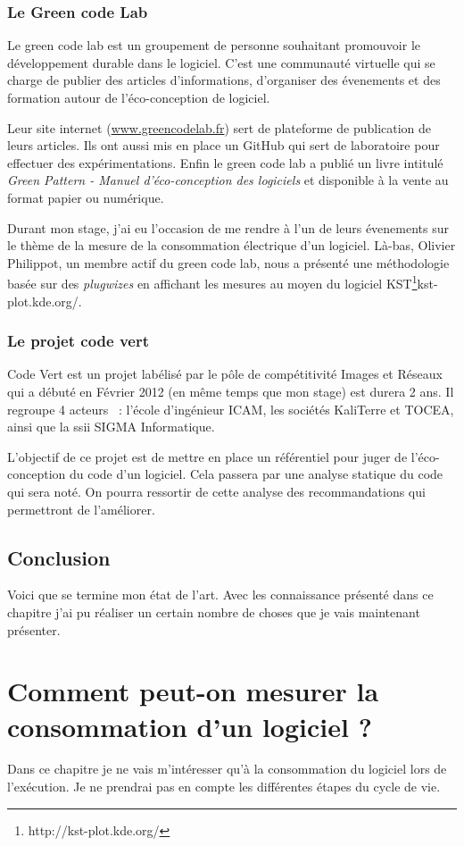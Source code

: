 \documentclass[a4paper, 11pt]{report}
\begin{document}
		\subsection{Le Green code Lab}
Le green code lab est un groupement de personne souhaitant promouvoir le développement durable dans le logiciel. C'est une communauté virtuelle qui se charge de publier des articles d'informations, d'organiser des évenements et des formation autour de l'éco-conception de logiciel.

Leur site internet (\href{http://www.greencodelab.fr}{www.greencodelab.fr}) sert de plateforme de publication de leurs articles. Ils ont aussi mis en place un GitHub qui sert de laboratoire pour effectuer des expérimentations. Enfin le green code lab a publié un livre intitulé \textit{Green Pattern - Manuel d'éco-conception des logiciels} et disponible à la vente au format papier ou numérique.

Durant mon stage, j'ai eu l'occasion de me rendre à l'un de leurs évenements sur le thème de la mesure de la consommation électrique d'un logiciel. Là-bas, Olivier Philippot, un membre actif du green code lab, nous a présenté une méthodologie basée sur des \textit{plugwizes} en affichant les mesures au moyen du logiciel KST\footnote{http://kst-plot.kde.org/}{kst-plot.kde.org/}.
		\subsection{Le projet code vert}
Code Vert est un projet labélisé par le pôle de compétitivité Images et Réseaux qui a débuté en Février 2012 (en même temps que mon stage) est durera 2 ans. Il regroupe 4 acteurs ~: l'école d'ingénieur ICAM, les sociétés KaliTerre et TOCEA, ainsi que la ssii SIGMA Informatique.

L'objectif de ce projet est de mettre en place un référentiel pour juger de l'éco-conception du code d'un logiciel. Cela passera par une analyse statique du code qui sera noté. On pourra ressortir de cette analyse des recommandations qui permettront de l'améliorer.
		
	\section{Conclusion}
Voici que se termine mon état de l'art. Avec les connaissance présenté dans ce chapitre j'ai pu réaliser un certain nombre de choses que je vais maintenant présenter.

\chapter{Comment peut-on mesurer la consommation d'un logiciel ?}
Dans ce chapitre je ne vais m'intéresser qu'à la consommation du logiciel lors de l'exécution. Je ne prendrai pas en compte les différentes étapes du cycle de vie.
\end{document}
